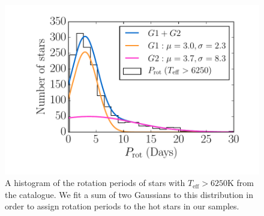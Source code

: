 \begin{figure}
\begin{center}
\includegraphics[width=6in, clip=true]{figures/hot_star_hist.pdf}
\caption[A histogram of the rotation periods of hot stars from
\citet{Mcquillan2014}.]
{A histogram of the rotation periods of stars with $T_{\mathrm{eff}} > 6250$K
from the \citet{Mcquillan2014} catalogue.
We fit a sum of two Gaussians to this distribution in order to assign rotation
periods to the hot stars in our \trilegal samples.}
\label{fig:hot_star_hist}
\end{center}
\end{figure}

